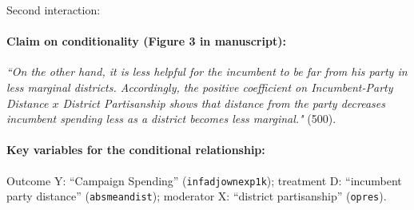 \documentclass[12pt]{article}
\begin{document}
\clearpage


\noindent Second interaction:

\paragraph{Claim on conditionality (Figure 3 in manuscript):} \emph{``On the other hand, it is less helpful for the incumbent to be far from his party in less marginal districts. Accordingly, the positive coefficient on Incumbent-Party Distance $x$ District Partisanship shows that distance from the party decreases incumbent spending less as a district becomes less marginal."} (500). 

\paragraph{Key variables for the conditional relationship:} Outcome Y:
``Campaign Spending'' (\texttt{infadjownexp1k}); treatment D: ``incumbent party distance'' (\texttt{absmeandist}); moderator X: ``district partisanship''
(\texttt{opres}).

\newpage
\end{document}
